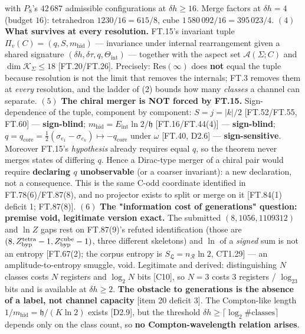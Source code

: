 \documentclass[11pt,openany]{report}
\theoremstyle{canonplain}
\theoremstyle{canondef}
\begin{document}
with $P_8$'s $42\,687$ admissible configurations at $\delta h\ge16$. Merge factors at $\delta h=4$ (budget $16$): tetrahedron $1230/16=615/8$, cube $1\,580\,092/16=395\,023/4$. $(4)$ \textbf{What survives at every resolution.} FT.15's invariant tuple $\Pi_v(C)=(q,S,m_{\mathrm{hid}})$ — invariance under internal rearrangement given a shared signature $(\delta h,\delta\tau,q,\Theta_{\mathrm{int}})$ — together with the aspect set $\mathcal A(\Sigma;C)$ and $\dim\mathcal K_\Sigma\le18$ [FT.20/FT.26]. Precisely: $\mathrm{Res}(\infty)$ does \textbf{not} equal the tuple because resolution is not the limit that removes the internals; FT.3 removes them at \textit{every} resolution, and the ladder of (2) bounds how many \textit{classes} a channel can separate. $(5)$ \textbf{The chiral merger is NOT forced by FT.15.} Sign-dependence of the tuple, component by component: $S=j=|k|/2$ [FT.52/FT.55, FT.60] — \textbf{sign-blind}; $m_{\mathrm{hid}}=E_{\mathrm{int}}\ln2/\mathfrak h$ [FT.16/FT.44(4)] — \textbf{sign-blind}; $q=q_{\mathrm{core}}=\tfrac12(\sigma_{e_1}-\sigma_{e_k})\mapsto-q_{\mathrm{core}}$ under $\omega$ [FT.40, D2.6] — \textbf{sign-sensitive}. Moreover FT.15's \textit{hypothesis} already requires equal $q$, so the theorem never merges states of differing $q$. Hence a Dirac-type merger of a chiral pair would require \textbf{declaring $q$ unobservable} (or a coarser invariant): a new declaration, not a consequence. This is the same C-odd coordinate identified in FT.78(6)/FT.87(8), and no projector exists to split or merge on it [FT.84(1) deficit 1; FT.87(8)]. $(6)$ \textbf{The "information cost of generations" question: premise void, legitimate version exact.} The submitted $(8,1056,1109312)$ and $\ln Z$ gaps rest on FT.87(9)'s refuted identification (those are $(8,Z^{\rm tetra}_{\mathrm{byp}}-1,Z^{\rm cube}_{\mathrm{byp}}-1)$, three different skeletons) and $\ln$ of a \textit{signed} sum is not an entropy [FT.67(2); the corpus entropy is $S_{\mathfrak L}=n_{\mathcal R}\ln2$, CT1.29] — an amplitude-to-entropy smuggle, void. Legitimate and derived: distinguishing $N$ classes costs $N$ registers and $\log_2N$ bits [C10], so $N=3$ costs $3$ registers / $\log_23$ bits and is available at $\delta h\ge2$. \textbf{The obstacle to generations is the absence of a label, not channel capacity} [item 20 deficit 3]. The Compton-like length $1/m_{\mathrm{hid}}=\mathfrak h/(K\ln2)$ exists [D2.9], but the threshold $\delta h\ge\lceil\log_2\#\text{classes}\rceil$ depends only on the class count, so \textbf{no Compton-wavelength relation arises}.
\end{document}

